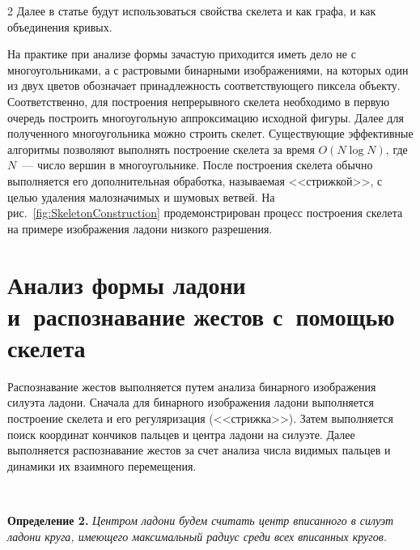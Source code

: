 \begin{multicols}{2}
Далее в статье будут использоваться свойства скелета и как графа, и как объединения кривых.

На практике при анализе формы зачастую приходится 
иметь дело не с многоугольниками, а с растровыми бинарными изображениями, на 
которых один из двух цветов обозначает принадлежность соответствующего пиксела объекту.
Соответственно, для построения непрерывного скелета необходимо в первую очередь построить 
многоугольную аппроксимацию исходной фигуры.
Далее для полученного многоугольника можно строить скелет.
Существующие эффективные алгоритмы позволяют выполнять построение скелета за время 
$O(N \log N)$,
где $N$~--- чис\-ло вершин в многоугольнике.
После построения скелета обычно выполняется его дополнительная обработка, 
называемая <<стрижкой>>, с целью удаления малозначимых и шумовых ветвей.
На рис.~\ref{fig:SkeletonConstruction} продемонстрирован процесс построения 
скелета на примере изображения ладони низкого разрешения.

\vspace*{-6pt}

\section{Анализ формы ладони и~распознавание жестов с~помощью скелета}\label{seq:PalmShapeAnalysis}

Распознавание жестов выполняется путем анализа бинарного изображения силуэта ладони.
Сначала для бинарного изображения ладони выполняется построение скелета и его 
регуляризация (<<стрижка>>).
Затем выполняется поиск координат кончиков пальцев и центра ладони на силуэте.
Далее выполняется распознавание жестов за счет анализа числа видимых пальцев и 
динамики их взаимного перемещения.

\begin{figure} %
\vspace*{1pt}
 \begin{center}
 \mbox{%
 \epsfxsize=145.854mm
 }
 \end{center}
 \vspace*{-9pt}
\end{figure}


\smallskip

\noindent
\textbf{Определение 2.} %
\textit{Центром ладони будем считать центр вписанного в силуэт ладони круга, имеющего максимальный радиус среди всех вписанных кругов.
}


\end{multicols}
